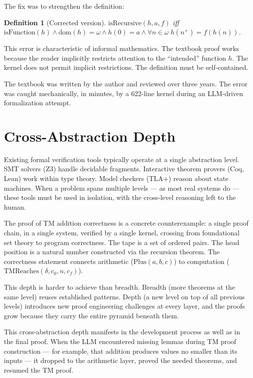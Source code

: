\documentclass[letterpaper]{article}
\newtheorem{definition}{Definition}
\begin{document}
The fix was to strengthen the definition:

\begin{definition}[Corrected version]
$\text{isRecursive}(h, a, f)$ iff $\text{isFunction}(h) \land
\text{dom}(h) = \omega \land h(0) = a \land \forall n \in \omega\;
h(n^+) = f(h(n))$.
\end{definition}

This error is characteristic of informal mathematics. The textbook proof
works because the reader implicitly restricts attention to the ``intended''
function $h$. The kernel does not permit implicit restrictions. The
definition must be self-contained.

The textbook was written by the author and reviewed over three years.
The error was caught mechanically, in minutes, by a 622-line kernel during an
LLM-driven formalization attempt.

\section{Cross-Abstraction Depth}
\label{sec:depth}

Existing formal verification tools typically operate at a single abstraction
level. SMT solvers (Z3) handle decidable fragments. Interactive theorem
provers (Coq, Lean) work within type theory. Model checkers (TLA+) reason
about state machines. When a problem spans multiple levels --- as most real
systems do --- these tools must be used in isolation, with the cross-level
reasoning left to the human.

The proof of TM addition correctness is a concrete counterexample: a single
proof chain, in a single system, verified by a single kernel, crossing from
foundational set theory to program correctness. The tape is a set of ordered
pairs. The head position is a natural number constructed via the recursion
theorem. The correctness statement connects arithmetic ($\text{Plus}(a,b,c)$)
to computation ($\text{TMReaches}(\delta, c_0, n, c_f)$).

This depth is harder to achieve than breadth. Breadth (more theorems at the
same level) reuses established patterns. Depth (a new level on top of all
previous levels) introduces new proof engineering challenges at every layer,
and the proofs grow because they carry the entire pyramid beneath them.

This cross-abstraction depth manifests in the development process as well
as in the final proof. When the LLM encountered missing lemmas during TM
proof construction --- for example, that addition produces values no smaller
than its inputs --- it dropped to the arithmetic layer, proved the needed
theorems, and resumed the TM proof.
\end{document}
